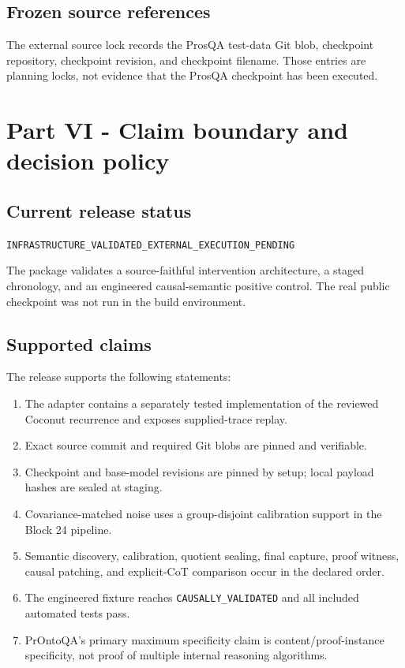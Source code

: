 \documentclass[
  10pt,
]{article}
\providecommand{\tightlist}{%
  \setlength{\itemsep}{0pt}\setlength{\parskip}{0pt}}
\begin{document}
\subsection{Frozen source references}\label{frozen-source-references}

The external source lock records the ProsQA test-data Git blob,
checkpoint repository, checkpoint revision, and checkpoint filename.
Those entries are planning locks, not evidence that the ProsQA
checkpoint has been executed.

\section{Part VI - Claim boundary and decision
policy}\label{part-vi---claim-boundary-and-decision-policy}

\subsection{Current release status}\label{current-release-status}

\texttt{INFRASTRUCTURE\_VALIDATED\_EXTERNAL\_EXECUTION\_PENDING}

The package validates a source-faithful intervention architecture, a
staged chronology, and an engineered causal-semantic positive control.
The real public checkpoint was not run in the build environment.

\subsection{Supported claims}\label{supported-claims}

The release supports the following statements:

\begin{enumerate}
\def\labelenumi{\arabic{enumi}.}
\tightlist
\item
  The adapter contains a separately tested implementation of the
  reviewed Coconut recurrence and exposes supplied-trace replay.
\item
  Exact source commit and required Git blobs are pinned and verifiable.
\item
  Checkpoint and base-model revisions are pinned by setup; local payload
  hashes are sealed at staging.
\item
  Covariance-matched noise uses a group-disjoint calibration support in
  the Block 24 pipeline.
\item
  Semantic discovery, calibration, quotient sealing, final capture,
  proof witness, causal patching, and explicit-CoT comparison occur in
  the declared order.
\item
  The engineered fixture reaches \texttt{CAUSALLY\_VALIDATED} and all
  included automated tests pass.
\item
  PrOntoQA's primary maximum specificity claim is content/proof-instance
  specificity, not proof of multiple internal reasoning algorithms.
\end{enumerate}
\end{document}
